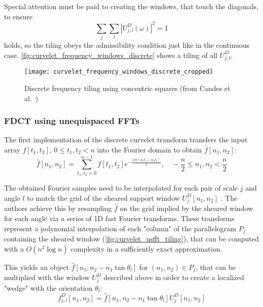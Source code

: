 Special attention must be paid to creating the windows, that touch the
diagonals, to ensure
\begin{equation*}
    \sum_{j} \sum_{l} | U_{j, l}^D (\omega)|^2 = 1
\end{equation*}
holds, so the tiling obeys the admissibility condition just like in the
continuous case. \autoref{fig:curvelet_frequency_windows_discrete} shows a
tiling of all $U_{j, l}^D$.

\begin{figure}[h]
    \centering
        \texttt{[image: curvelet\_frequency\_windows\_discrete\_cropped]}
    \caption[Discrete frequency tiling using concentric squares]{
        Discrete frequency tiling using concentric squares (from Candes et al.\
        \autocite{candes_fast_2006})
    }
    \label{fig:curvelet_frequency_windows_discrete}
\end{figure}

\subsubsection{FDCT using unequispaced FFTs}

The first implementation of the discrete curvelet transform transfers the input
array $f[t_1, t_2]$, $0 \leq t_1, t_2 < n$ into the Fourier domain to obtain
$\hat{f}[n_1, n_2]$:
\begin{equation*}
    \hat{f}[n_1, n_2] = \sum_{t_1, t_2 = 0}^{n - 1} f[t_1, t_2] e^{- \frac{i 2 \pi (n_1 t_1 + n_2 t_2)}{n}}, \quad -\frac{n}{2} \leq n_1, n_2 < \frac{n}{2}
\end{equation*}

The obtained Fourier samples need to be interpolated for each pair of scale $j$
and angle $l$ to match the grid of the sheared support window $U_j^D[n_1, n_2]$
. The authors achieve this by resampling $\hat{f}$ on the grid
implied by the sheared window for each angle via a series of 1D fast Fourier
transforms.  These transforms represent a polynomial interpolation of each
"column" of the parallelogram $P_j$ containing the sheared window
(\autoref{fig:curvelet_usfft_tiling}), that can be computed with a $O(n^2 \log
n)$ complexity in a sufficiently exact approximation.

This yields an object $\hat{f}[n_1, n_2 - n_1 \tan \theta_l]$ for $(n_1, n_2)
\in P_j$, that can be multiplied with the window $U_j^D$ described above in
order to create a localized "wedge" with the orientation $\theta_l$:
\begin{equation*}
    f_{j, l}^D[n_1, n_2] = \hat{f}[n_1, n_2 - n_1 \tan \theta_l] U_j^D[n_1, n_2]
\end{equation*}

